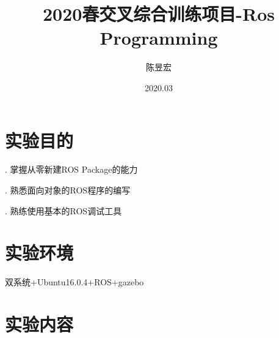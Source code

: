 \documentclass[12pt,UTF8]{ctexart}
\title{2020春交叉综合训练项目-Ros Programming}
\author{陈昱宏}
\date{2020.03}
\begin{document}
	\begin{titlingpage}
		\maketitle
	\end{titlingpage}
	\newpage
	\tableofcontents\vspace{30pt}
	\clearpage
    \section{实验目的}
    . 掌握从零新建ROS Package的能力
    
    . 熟悉面向对象的ROS程序的编写

    . 熟练使用基本的ROS调试工具
    \section{实验环境}
    \noindent
    双系统+Ubuntu16.0.4+ROS+gazebo
    \section{实验内容}
\end{document}
